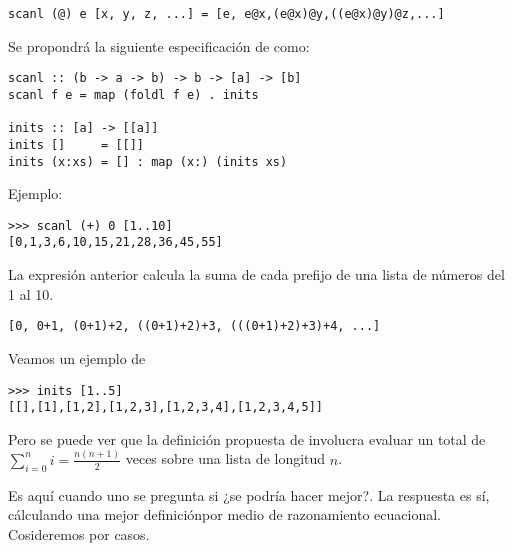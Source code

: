 \begin{verbatim}
scanl (@) e [x, y, z, ...] = [e, e@x,(e@x)@y,((e@x)@y)@z,...]
\end{verbatim}

Se propondrá la siguiente especificación de  como:
\begin{verbatim}
scanl :: (b -> a -> b) -> b -> [a] -> [b]
scanl f e = map (foldl f e) . inits

inits :: [a] -> [[a]]
inits []     = [[]]
inits (x:xs) = [] : map (x:) (inits xs)
\end{verbatim}

Ejemplo:
\begin{verbatim}
>>> scanl (+) 0 [1..10]
[0,1,3,6,10,15,21,28,36,45,55]
\end{verbatim}

La expresión anterior calcula la suma de cada prefijo de una lista de números del 1 al 10.
\begin{verbatim}
[0, 0+1, (0+1)+2, ((0+1)+2)+3, (((0+1)+2)+3)+4, ...]
\end{verbatim}

Veamos un ejemplo de 
\begin{verbatim}
>>> inits [1..5]
[[],[1],[1,2],[1,2,3],[1,2,3,4],[1,2,3,4,5]]
\end{verbatim}

Pero se puede ver que la definición propuesta de  involucra evaluar  un
total de $\sum_{i=0}^{n} i = \frac{n(n+1)}{2}$ veces sobre una lista de longitud $n$.

Es aquí cuando uno se pregunta si ¿se podría hacer mejor?. La respuesta es sí, cálculando una mejor
definiciónpor medio de razonamiento ecuacional. Cosideremos por casos.

